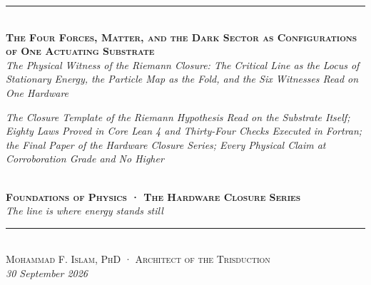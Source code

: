 \documentclass[10pt]{article}
\begin{document}
\begin{center}
{\color{accent}\rule{0.6\textwidth}{0.8pt}}\\[10pt]
{\bfseries\scshape\fontsize{19}{23}\selectfont The Four Forces, Matter,
and the Dark Sector as Configurations of One Actuating Substrate}\\[7pt]
{\itshape\large The Physical Witness of the Riemann Closure: The
Critical Line as the Locus of Stationary Energy, the Particle Map as the
Fold, and the Six Witnesses Read on One Hardware}\\[6pt]
\parbox{0.86\textwidth}{\centering\small\itshape\color{faint} The
Closure Template of the Riemann Hypothesis Read on the Substrate Itself;
Eighty Laws Proved in Core Lean 4 and Thirty-Four Checks Executed in
Fortran; the Final Paper of the Hardware Closure Series; Every Physical
Claim at Corroboration Grade and No Higher}\\[8pt]
{\footnotesize\color{accent}\scshape\bfseries Foundations of Physics ·
The Hardware Closure Series}\\[3pt]
{\itshape\color{deep}\small The line is where energy stands
still}\\[9pt]
{\color{accent}\rule{0.6\textwidth}{0.8pt}}\\[10pt]
{\scshape Mohammad F. Islam, PhD · Architect of the Trisduction}\\[2pt]

{\itshape\color{faint}\small 30 September 2026}\\[12pt]
\end{center}
\noindent{\color{accent}\rule{\textwidth}{0.6pt}}\\[2pt]
\end{document}
